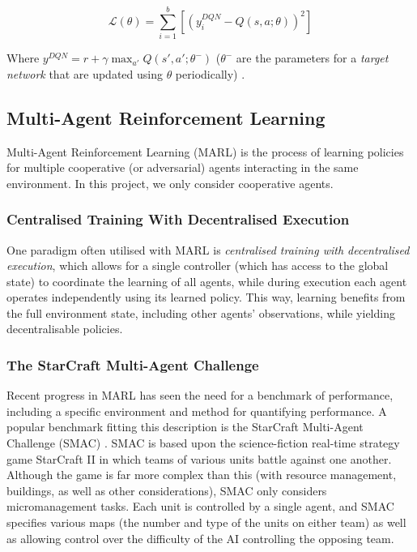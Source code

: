 \[\mathscr{L}(\theta)=\sum_{i=1}^{b}[(y_i^{DQN}-Q(s,a;\theta))^2]\]

Where $y^{DQN}=r+\gamma \max_{a'}Q(s',a';\theta^-)$ ($\theta^-$ are the parameters for a \textit{target network} that are updated using $\theta$ periodically) \cite{qmixcite}.



\subsection{Multi-Agent Reinforcement Learning}
Multi-Agent Reinforcement Learning (MARL) is the process of learning policies for multiple cooperative (or adversarial) agents interacting in the same environment. In this project, we only consider cooperative agents. 


\subsubsection{Centralised Training With Decentralised Execution}

One paradigm often utilised with MARL is \textit{centralised training with decentralised execution}, which allows for a single controller (which has access to the global state) to coordinate the learning of all agents, while during execution each agent operates independently using its learned policy. This way, learning benefits from the full environment state, including other agents' observations, while yielding decentralisable policies.

\subsubsection{The StarCraft Multi-Agent Challenge}

Recent progress in MARL has seen the need for a benchmark of performance, including a specific environment and method for quantifying performance. A popular benchmark fitting this description is the StarCraft Multi-Agent Challenge (SMAC) \cite{smac}. SMAC is based upon the science-fiction real-time strategy game StarCraft II in which teams of various units battle against one another. Although the game is far more complex than this (with resource management, buildings, as well as other considerations), SMAC only considers micromanagement tasks. Each unit is controlled by a single agent, and SMAC specifies various maps (the number and type of the units on either team) as well as allowing control over the difficulty of the AI controlling the opposing team. 


